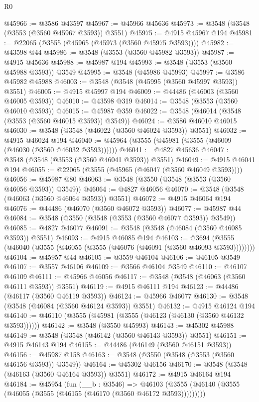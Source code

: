 \begin{lexlean}{R0}
\begin{coremodule}
@45966 := @3586 @43597
@45967 := @45966 @45636
@45973 := @3548 (@3548 (@3553 (@3560 @45967 @3593)) @3551)
@45975 := @4915 @45967 @194
@45981 := @22065 (@3555 (@45965 (@45973 (@3560 @45975 @3593))))
@45982 := @43598 @44
@45986 := @3548 (@3553 (@3560 @45982 @3593))
@45987 := @4915 @45636
@45988 := @45987 @194
@45993 := @3548 (@3553 (@3560 @45988 @3593)) @3549
@45995 := @3548 (@45986 @45993)
@45997 := @3586 @45982 @45988
@46003 := @3548 (@3548 (@45995 (@3560 @45997 @3593)) @3551)
@46005 := @4915 @45997 @194
@46009 := @44486 (@46003 (@3560 @46005 @3593))
@46010 := @43598 @319
@46014 := @3548 (@3553 (@3560 @46010 @3593))
@46015 := @45987 @359
@46022 := @3548 (@46014 (@3548 (@3553 (@3560 @46015 @3593)) @3549))
@46024 := @3586 @46010 @46015
@46030 := @3548 (@3548 (@46022 (@3560 @46024 @3593)) @3551)
@46032 := @4915 @46024 @194
@46040 := @45964 (@3555 (@45981 (@3555 (@46009 (@46030 (@3560 @46032 @3593))))))
@46041 := @4827 @45636
@46047 := @3548 (@3548 (@3553 (@3560 @46041 @3593)) @3551)
@46049 := @4915 @46041 @194
@46055 := @22065 (@3555 (@45965 (@46047 (@3560 @46049 @3593))))
@46056 := @45987 @80
@46063 := @3548 (@3550 (@3548 (@3553 (@3560 @46056 @3593)) @3549))
@46064 := @4827 @46056
@46070 := @3548 (@3548 (@46063 (@3560 @46064 @3593)) @3551)
@46072 := @4915 @46064 @194
@46076 := @44486 (@46070 (@3560 @46072 @3593))
@46077 := @45987 @44
@46084 := @3548 (@3550 (@3548 (@3553 (@3560 @46077 @3593)) @3549))
@46085 := @4827 @46077
@46091 := @3548 (@3548 (@46084 (@3560 @46085 @3593)) @3551)
@46093 := @4915 @46085 @194
@46103 := @3694 (@3555 (@46040 (@3555 (@46055 (@3555 (@46076 (@46091 (@3560 @46093 @3593))))))))
@46104 := @45957 @44
@46105 := @3559 @46104
@46106 := @46105 @3549
@46107 := @3557 @46106
@46109 := @3566 @46104 @3549
@46110 := @46107 @46109
@46111 := @45966 @46056
@46117 := @3548 (@3548 (@46063 (@3560 @46111 @3593)) @3551)
@46119 := @4915 @46111 @194
@46123 := @44486 (@46117 (@3560 @46119 @3593))
@46124 := @45966 @46077
@46130 := @3548 (@3548 (@46084 (@3560 @46124 @3593)) @3551)
@46132 := @4915 @46124 @194
@46140 := @46110 (@3555 (@45981 (@3555 (@46123 (@46130 (@3560 @46132 @3593))))))
@46142 := @3548 (@3550 @45993)
@46143 := @45302 @45988
@46149 := @3548 (@3548 (@46142 (@3560 @46143 @3593)) @3551)
@46151 := @4915 @46143 @194
@46155 := @44486 (@46149 (@3560 @46151 @3593))
@46156 := @45987 @158
@46163 := @3548 (@3550 (@3548 (@3553 (@3560 @46156 @3593)) @3549))
@46164 := @45302 @46156
@46170 := @3548 (@3548 (@46163 (@3560 @46164 @3593)) @3551)
@46172 := @4915 @46164 @194
@46184 := @45954
    (fun (__b : @3546) =>
    @46103 (@3555 (@46140 (@3555 (@46055 (@3555 (@46155 (@46170 (@3560 @46172 @3593)))))))))

\end{coremodule}
\end{lexlean}
